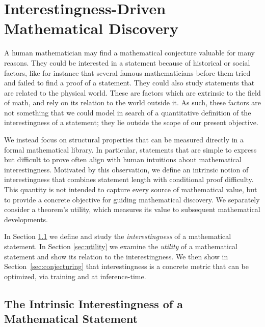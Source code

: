 \section{Interestingness-Driven Mathematical Discovery}
\label{sec:structure}

A human mathematician may find a mathematical conjecture valuable for many reasons.
%
They could be interested in a statement because of historical or social factors, like for instance that several famous mathematicians before them tried and failed to find a proof of a statement.
%
They could also study statements that are related to the physical world. These are factors which are extrinsic to the field of math, and rely on its relation to the world outside it. 
%
As such, these factors are not something that we could model in search of a quantitative definition of the interestingness of a statement; they lie outside the scope of our present objective.

%
We instead focus on structural properties that can be measured directly in a formal mathematical library.
%
In particular, statements that are simple to express but difficult to prove often align with human intuitions about mathematical interestingness.
%
Motivated by this observation, we define an intrinsic notion of interestingness that combines statement length with conditional proof difficulty. 
%
This quantity is not intended to capture every source of mathematical value, but to provide a concrete objective for guiding mathematical discovery.
%
We separately consider a theorem's utility, which measures its value to subsequent mathematical developments.

In Section \ref{sec:interestingness} we define and study the \emph{interestingness} of a mathematical statement.
%
In Section \ref{sec:utility} we examine the \emph{utility} of a mathematical statement and show its relation to the interestingness.
%
We then show in Section~\ref{sec:conjecturing} that interestingness is a concrete metric that can be optimized, via training and at inference-time.

\subsection{The Intrinsic Interestingness of a Mathematical Statement}
\label{sec:interestingness}

